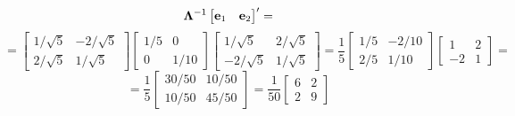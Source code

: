 \begin{enumerate}[label=(\alph*)]
\[                {\bold{\Lambda}}^{-1}
                \begin{bmatrix}
                    \bold{e}_1 & \bold{e}_2
                \end{bmatrix}^\prime =
            \]
            \[
                =
                \begin{bmatrix}
                    1/\sqrt{5} & -2/\sqrt{5} \\
                    2/\sqrt{5} & 1/\sqrt{5}
                \end{bmatrix}
                \begin{bmatrix}
                    1/5 & 0 \\
                    0 & 1/10
                \end{bmatrix}
                \begin{bmatrix}
                    1/\sqrt{5} & 2/\sqrt{5} \\
                    -2/\sqrt{5} & 1/\sqrt{5}
                \end{bmatrix} =
                \frac{1}{5}
                \begin{bmatrix}
                    1/5 & -2/10 \\
                    2/5 & 1/10
                \end{bmatrix}
                \begin{bmatrix}
                    1 & 2 \\
                    -2 & 1
                \end{bmatrix} =
            \]
            \[
                =
                \frac{1}{5}
                \begin{bmatrix}
                    30/50 & 10/50 \\
                    10/50 & 45/50
                \end{bmatrix}
                =
                \frac{1}{50}
                \begin{bmatrix}
                    6 & 2 \\
                    2 & 9
                \end{bmatrix}
            \]


\end{enumerate}

